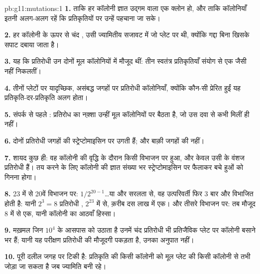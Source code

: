\begin{solution}{pb:g11:mutations:1}
\textbf{1.} ताकि हर कॉलोनी ज्ञात उद्गम वाला एक क्लोन हो, और ताकि
कॉलोनियाँ इतनी अलग-अलग रहें कि प्रतिकृतियों पर उन्हें पहचाना जा सके।

\textbf{2.} हर कॉलोनी के ऊपर से चंद , उसी ज्यामितीय सजावट में जो
प्लेट पर थी, क्योंकि गद्दा बिना खिसके सपाट दबाया जाता है।

\textbf{3.} यह कि प्रतिरोधी  उन दोनों मूल कॉलोनियों में मौजूद
थीं: तीन स्वतंत्र प्रतिकृतियाँ संयोग से एक जैसी नहीं निकलतीं।

\textbf{4.} तीनों प्लेटों पर यादृच्छिक, असंबद्ध जगहों पर प्रतिरोधी
कॉलोनियाँ, क्योंकि कौन-सी  प्रेरित हुईं यह प्रतिकृति-दर-प्रतिकृति
अलग होता।

\textbf{5.} संपर्क से पहले : प्रतिरोध का नक़्शा उन्हीं मूल
कॉलोनियों पर बैठता है, जो उस दवा से कभी मिलीं ही नहीं।

\textbf{6.} दोनों प्रतिरोधी जगहों की  स्ट्रेप्टोमाइसिन पर उगती
हैं; और बाक़ी जगहों की नहीं।

\textbf{7.} शायद कुछ ही: वह  कॉलोनी की वृद्धि के दौरान किसी
विभाजन पर हुआ, और केवल उसी  के वंशज प्रतिरोधी हैं। तय करने के लिए
कॉलोनी की ज्ञात संख्या भर  स्ट्रेप्टोमाइसिन पर फैलाकर बचे हुओं को
गिनना होगा।

\textbf{8.} 23 में से 20वें विभाजन पर: $1/2^{20-1}$\dots या और सरलता से,
वह उत्परिवर्ती  फिर 3 बार और विभाजित होती है: यानी
$2^3 = 8$ प्रतिरोधी , $2^{23}$ में से, क़रीब दस लाख में एक। और तीसरे विभाजन पर:
तब मौजूद 8  में से एक, यानी कॉलोनी का आठवाँ हिस्सा।

\textbf{9.} मख़मल जिन $10^4$ के आसपास  को उठाता है उनमें चंद
प्रतिरोधी  भी प्रतिजैविक प्लेट पर कॉलोनी बसाने भर हैं; यानी यह
परीक्षण प्रतिरोधी  की मौजूदगी पकड़ता है, उनका अनुपात नहीं।

\textbf{10.} पूरी दलील जगह पर टिकी है: प्रतिकृति की किसी कॉलोनी को मूल
प्लेट की किसी कॉलोनी से तभी जोड़ा जा सकता है जब ज्यामिति बनी रहे।


\end{solution}
